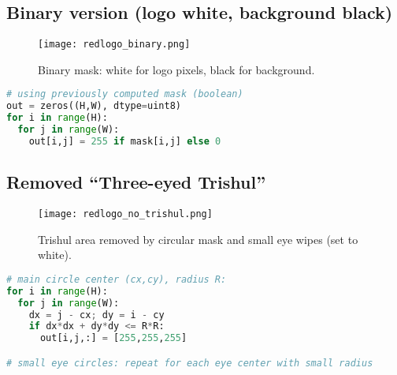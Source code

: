 \documentclass[11pt,a4paper]{article}
\begin{document}
\clearpage
\subsection{Binary version (logo white, background black)}
\begin{figure}[H]
  \centering
  \texttt{[image: redlogo\_binary.png]}
  \caption{Binary mask: white for logo pixels, black for background.}
\end{figure}
\begin{lstlisting}[language=Python, caption=Manual binary mask snippet]
# using previously computed mask (boolean)
out = zeros((H,W), dtype=uint8)
for i in range(H):
  for j in range(W):
    out[i,j] = 255 if mask[i,j] else 0
\end{lstlisting}

\clearpage
\subsection{Removed ``Three-eyed Trishul''}
\begin{figure}[H]
  \centering
  \texttt{[image: redlogo\_no\_trishul.png]}
  \caption{Trishul area removed by circular mask and small eye wipes (set to white).}
\end{figure}
\begin{lstlisting}[language=Python, caption=Manual trishul removal snippet]
# main circle center (cx,cy), radius R:
for i in range(H):
  for j in range(W):
    dx = j - cx; dy = i - cy
    if dx*dx + dy*dy <= R*R:
      out[i,j,:] = [255,255,255]

# small eye circles: repeat for each eye center with small radius
\end{lstlisting}

\clearpage
\end{document}
